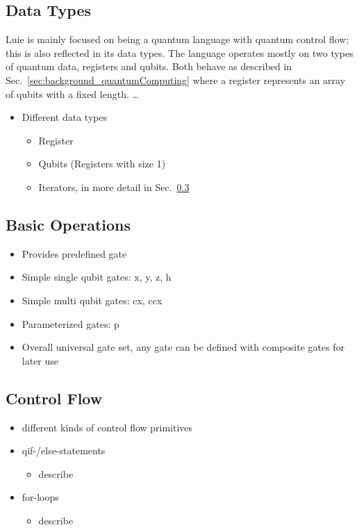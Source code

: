 \subsection{Data Types}
\label{sec:concept_dataTypes}
Luie is mainly focused on being a quantum language with quantum control flow; this is also reflected in its data types. The language operates mostly on two types of quantum data, registers and qubits. Both behave as described in Sec.~\ref{sec:background_quantumComputing} where a register represents an array of qubits with a fixed length.
\dots
\begin{itemize}
    \item Different data types
    \begin{itemize}
        \item Register
        \item Qubits (Registers with size 1)
        \item Iterators, in more detail in Sec.~\ref{sec:concept_controlFlow}
    \end{itemize}
\end{itemize}


\subsection{Basic Operations}
\label{sec:concept_basicOperations}
\begin{itemize}
    \item Provides predefined gate
    \item Simple single qubit gates: x, y, z, h
    \item Simple multi qubit gates: cx, ccx
    \item Parameterized gates: p
    \item Overall universal gate set, any gate can be defined with composite gates for later use
\end{itemize}

\subsection{Control Flow}
\label{sec:concept_controlFlow}
\begin{itemize}
    \item different kinds of control flow primitives
    \item qif-/else-statements
    \begin{itemize}
        \item describe
    \end{itemize}
    \item for-loops
    \begin{itemize}
        \item describe
    \end{itemize}
\end{itemize}

